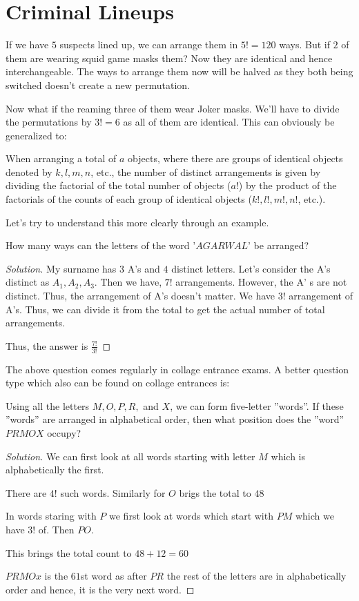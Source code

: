\section{Criminal Lineups}
If we have $5$ suspects lined up, we can arrange them in $5!=120$ ways. But if $2$ of them are wearing squid 
game masks them? Now they are identical and hence interchangeable. The ways to arrange them now will be halved 
as they both being switched doesn't create a new permutation.\par
Now what if the reaming three of them wear Joker masks. We'll have to divide the permutations by $3!=6$ as all 
of them are identical. This can obviously be generalized to:
\begin{theorem}
When arranging a total of $a$ objects, where there are groups of identical objects denoted by $k, l, m, n$, etc., the number of distinct arrangements is given by dividing the factorial of the total number of objects ($a!$) by the product of the factorials of the counts of each group of identical objects ($k!, l!, m!, n!$, etc.).
\end{theorem}
Let's try to understand this more clearly through an example.
\begin{example}
    How many ways can the letters of the word '$AGARWAL$' be arranged?
\end{example}
\begin{proof}
    [Solution]
    My surname has $3$ A's and $4$ distinct letters. Let's consider the A's distinct as $A_1,A_2,A_3$. 
    Then we have, $7!$ arrangements. However, the A' s are not distinct. Thus, the arrangement of 
    A's doesn't matter. We have $3!$ arrangement of A's. Thus, we can divide it from the total to get the 
    actual number of total arrangements.\par
    Thus, the answer is $\frac{7!}{3!}$
\end{proof}
The above question comes regularly in collage entrance exams. A better question type which 
also can be found on collage entrances is:
\begin{example}
    Using all the letters $M, O, P, R,$ and $X$, we can form five-letter ”words”. 
    If these ”words” are arranged in alphabetical order, then what position does the ”word” $PRMOX$ occupy?
\end{example}
\begin{proof}
    [Solution]
    We can first look at all words starting with letter $M$ which is alphabetically the first.\par
    There are $4!$ such words. Similarly for $O$ brigs the total to $48$\par
    In words staring with $P$ we first look at words which start with $PM$ which we have $3!$ of. Then $PO$.\par
    This brings the total count to $48+12=60$\par
    $PRMOx$ is the $61$st word as after $PR$ the rest of the letters are in 
    alphabetically order and hence, it is the very next word.
\end{proof}
